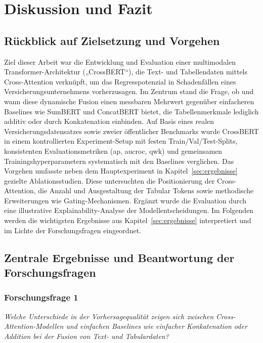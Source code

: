 \section{Diskussion und Fazit}

\subsection{Rückblick auf Zielsetzung und Vorgehen}

Ziel dieser Arbeit war die Entwicklung und Evaluation einer multimodalen Transformer-Architektur („CrossBERT“), die Text- und Tabellendaten mittels Cross-Attention verknüpft, um das Regresspotenzial in Schadenfällen eines Versicherungsunternehmens vorherzusagen. Im Zentrum stand die Frage, ob und wann diese dynamische Fusion einen messbaren Mehrwert gegenüber einfacheren Baselines wie SumBERT und ConcatBERT bietet, die Tabellenmerkmale lediglich additiv oder durch Konkatenation einbinden. Auf Basis eines realen Versicherungsdatensatzes sowie zweier öffentlicher Benchmarks wurde CrossBERT in einem kontrollierten Experiment-Setup mit festen Train/Val/Test-Splits, konsistenten Evaluationsmetriken (\Gls{ap}, \Gls{aucroc}, \Gls{qwk}) und gemeinsamen Trainingshyperparametern systematisch mit den Baselines verglichen. 
Das Vorgehen umfasste neben dem Hauptexperiment in Kapitel~\ref{sec:ergebnisse} gezielte Ablationsstudien. Diese untersuchten die Positionierung der Cross-Attention, die Anzahl und Ausgestaltung der Tabular Tokens sowie methodische Erweiterungen wie Gating-Mechanismen. Ergänzt wurde die Evaluation durch eine illustrative Explainability-Analyse der Modellentscheidungen. 
Im Folgenden werden die wichtigsten Ergebnisse aus Kapitel~\ref{sec:ergebnisse} interpretiert und im Lichte der Forschungsfragen eingeordnet.

\subsection{Zentrale Ergebnisse und Beantwortung der Forschungsfragen}

\subsubsection*{Forschungsfrage 1}
\textit{Welche Unterschiede in der Vorhersagequalität zeigen sich zwischen Cross-Attention-Modellen und einfachen Baselines wie einfacher Konkatenation oder Addition bei der Fusion von Text- und Tabulardaten?}

